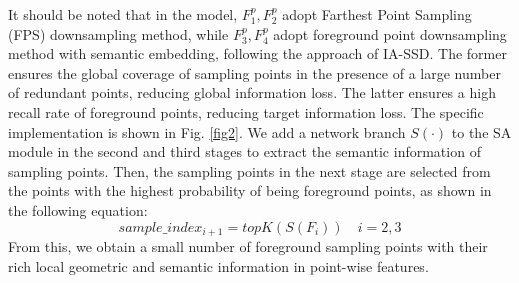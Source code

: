 It should be noted that in the model, $F^p_{1}, F^p_{2}$ adopt Farthest Point Sampling (FPS) downsampling method, while $F^p_{3}, F^p_{4}$ adopt foreground point downsampling method with semantic embedding, following the approach of IA-SSD. The former ensures the global coverage of sampling points in the presence of a large number of redundant points, reducing global information loss. The latter ensures a high recall rate of foreground points, reducing target information loss. The specific implementation is shown in Fig. \ref{fig2}. We add a network branch $S(\cdot)$ to the SA module in the second and third stages to extract the semantic information of sampling points. Then, the sampling points in the next stage are selected from the points with the highest probability of being foreground points, as shown in the following equation:
\begin{equation}
	sample\_index_{i+1}=topK(S(F_i)) \quad i=2,3
\end{equation}
From this, we obtain a small number of foreground sampling points with their rich local geometric and semantic information in point-wise features.